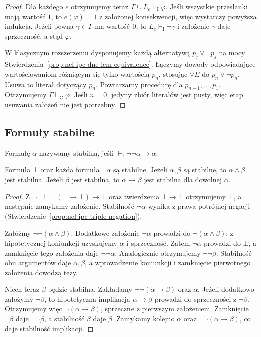 \begin{proof}
Dla każdego $e$ otrzymujemy teraz
$\Gamma\cup L_e\vdash_{\mathrm I}\varphi$.
Jeśli wszystkie przesłanki mają wartość $1$,
to $e(\varphi)=1$ z założonej konsekwencji,
więc wystarczy powyższa indukcja.
Jeżeli pewna $\gamma\in\Gamma$ ma wartość $0$,
to $L_e\vdash_{\mathrm I}\neg\gamma$ i założenie
$\gamma$ daje sprzeczność, a stąd $\varphi$.

W klasycznym rozszerzeniu dysponujemy każdą
alternatywą $p_j\vee\neg p_j$ na mocy
Stwierdzenia~\ref{prop:ncl-ipc-dne-lem-equivalence}.
Łączymy dowody odpowiadające wartościowaniom
różniącym się tylko wartością $p_n$, stosując
$\vee E$ do $p_n\vee\neg p_n$.
Usuwa to literał dotyczący $p_n$.
Powtarzamy procedurę dla $p_{n-1},\ldots,p_1$.
Otrzymujemy $\Gamma\vdash_{\mathrm C}\varphi$.
Jeśli $n=0$, jedyny zbiór literałów jest pusty,
więc etap usuwania założeń nie jest potrzebny.
\end{proof}

\subsection{Formuły stabilne}

\begin{definicja}
\label{def:ncl-ipc-stable}
Formułę $\alpha$ nazywamy stabilną, jeśli
$\vdash_{\mathrm I}\neg\neg\alpha\to\alpha$.
\end{definicja}

\begin{lemat}
\label{lem:ncl-ipc-stability-closure}
Formuła $\bot$ oraz każda formuła $\neg\alpha$
są stabilne. Jeżeli $\alpha,\beta$ są stabilne,
to $\alpha\wedge\beta$ jest stabilna.
Jeżeli $\beta$ jest stabilna, to
$\alpha\to\beta$ jest stabilna dla dowolnej $\alpha$.
\end{lemat}
\begin{proof}
Z $\neg\neg\bot=(\bot\to\bot)\to\bot$ oraz
twierdzenia $\bot\to\bot$ otrzymujemy $\bot$,
a następnie zamykamy założenie.
Stabilność $\neg\alpha$ wynika z prawa potrójnej
negacji (Stwierdzenie~\ref{prop:ncl-ipc-triple-negation}).

Załóżmy $\neg\neg(\alpha\wedge\beta)$.
Dodatkowe założenie $\neg\alpha$ prowadzi do
$\neg(\alpha\wedge\beta)$: z hipotetycznej
koniunkcji uzyskujemy $\alpha$ i sprzeczność.
Zatem $\neg\alpha$ prowadzi do $\bot$,
a zamknięcie tego założenia daje $\neg\neg\alpha$.
Analogicznie otrzymujemy $\neg\neg\beta$.
Stabilność obu argumentów daje $\alpha,\beta$,
a wprowadzenie koniunkcji i zamknięcie
pierwotnego założenia dowodzą tezy.

Niech teraz $\beta$ będzie stabilna.
Zakładamy $\neg\neg(\alpha\to\beta)$ oraz $\alpha$.
Jeżeli dodatkowo założymy $\neg\beta$,
to hipotetyczna implikacja $\alpha\to\beta$
prowadzi do sprzeczności z $\neg\beta$.
Otrzymujemy więc $\neg(\alpha\to\beta)$,
sprzeczne z pierwszym założeniem.
Zamknięcie $\neg\beta$ daje $\neg\neg\beta$,
a stabilność $\beta$ daje $\beta$.
Zamykamy kolejno $\alpha$ oraz
$\neg\neg(\alpha\to\beta)$, co daje stabilność
implikacji.
\end{proof}

